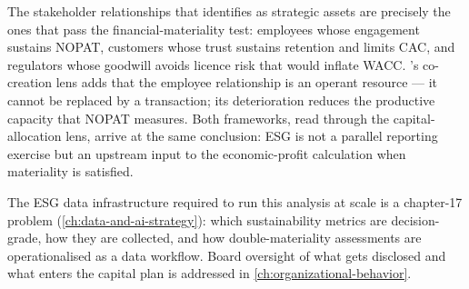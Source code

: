 The stakeholder relationships that \textcite{freeman2010strategic} identifies as strategic assets
are precisely the ones that pass the financial-materiality test: employees whose engagement
sustains NOPAT, customers whose trust sustains retention and limits CAC, and regulators whose
goodwill avoids licence risk that would inflate WACC. \textcite{vargo2004service}'s co-creation
lens adds that the employee relationship is an operant resource --- it cannot be replaced by a
transaction; its deterioration reduces the productive capacity that NOPAT measures. Both
frameworks, read through the capital-allocation lens, arrive at the same conclusion: ESG is not
a parallel reporting exercise but an upstream input to the economic-profit calculation when
materiality is satisfied.

The ESG data infrastructure required to run this analysis at scale is a chapter-17 problem
(\cref{ch:data-and-ai-strategy}): which sustainability metrics are decision-grade, how they are
collected, and how double-materiality assessments are operationalised as a data workflow. Board
oversight of what gets disclosed and what enters the capital plan is addressed in
\cref{ch:organizational-behavior}.
